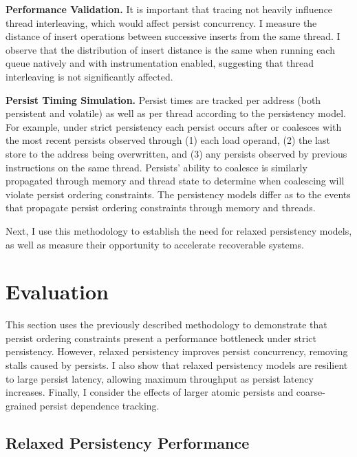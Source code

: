 \textbf{Performance Validation.}
It is important that tracing not heavily influence thread interleaving, which would affect persist concurrency.
I measure the distance of insert operations between successive inserts from the same thread.
I observe that the distribution of insert distance is the same when running each queue natively and with instrumentation enabled, suggesting that thread interleaving is not significantly affected.

\textbf{Persist Timing Simulation.}
Persist times are tracked per address (both persistent and volatile) as well as per thread according to the persistency model.
For example, under strict persistency each persist occurs after or coalesces with the most recent persists observed through (1) each load operand, (2) the last store to the address being overwritten, and (3) any persists observed by previous instructions on the same thread.
Persists' ability to coalesce is similarly propagated through memory and thread state to determine when coalescing will violate persist ordering constraints.
The persistency models differ as to the events that propagate persist ordering constraints through memory and threads.

Next, I use this methodology to establish the need for relaxed persistency models, as well as measure their opportunity to accelerate recoverable systems.

\section{Evaluation}
\label{sec:PersistencyEval:Evaluation}

This section uses the previously described methodology to demonstrate that persist ordering constraints present a performance bottleneck under strict persistency.
However, relaxed persistency improves persist concurrency, removing stalls caused by persists.
I also show that relaxed persistency models are resilient to large persist latency, allowing maximum throughput as persist latency increases.
Finally, I consider the effects of larger atomic persists and coarse-grained persist dependence tracking. 

\subsection{Relaxed Persistency Performance}
\label{section:Evaluation:PersistencyPerformance}

